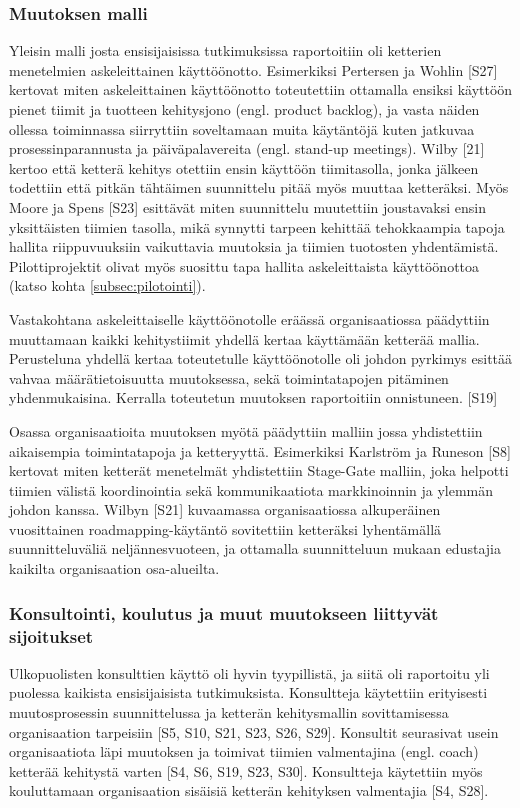 \subsubsection{Muutoksen malli}

Yleisin malli josta ensisijaisissa tutkimuksissa raportoitiin oli ketterien
menetelmien askeleittainen käyttöönotto. Esimerkiksi Pertersen ja Wohlin [S27]
kertovat miten askeleittainen käyttöönotto toteutettiin ottamalla ensiksi
käyttöön pienet tiimit ja tuotteen kehitysjono (engl. product backlog), ja vasta
näiden ollessa toiminnassa siirryttiin soveltamaan muita käytäntöjä kuten
jatkuvaa prosessinparannusta ja päiväpalavereita (engl. stand-up meetings).
Wilby [21] kertoo että ketterä kehitys otettiin ensin käyttöön tiimitasolla,
jonka jälkeen todettiin että pitkän tähtäimen suunnittelu pitää myös muuttaa
ketteräksi. Myös Moore ja Spens [S23] esittävät miten suunnittelu muutettiin
joustavaksi ensin yksittäisten tiimien tasolla, mikä synnytti tarpeen kehittää
tehokkaampia tapoja hallita riippuvuuksiin vaikuttavia muutoksia ja tiimien
tuotosten yhdentämistä. Pilottiprojektit olivat myös suosittu tapa hallita
askeleittaista käyttöönottoa (katso kohta \ref{subsec:pilotointi}).

Vastakohtana askeleittaiselle käyttöönotolle eräässä organisaatiossa päädyttiin
muuttamaan kaikki kehitystiimit yhdellä kertaa käyttämään ketterää mallia.
Perusteluna yhdellä kertaa toteutetulle käyttöönotolle oli johdon pyrkimys
esittää vahvaa määrätietoisuutta muutoksessa, sekä toimintatapojen pitäminen
yhdenmukaisina. Kerralla toteutetun muutoksen raportoitiin onnistuneen. [S19]

Osassa organisaatioita muutoksen myötä päädyttiin malliin jossa yhdistettiin
aikaisempia toimintatapoja ja ketteryyttä. Esimerkiksi Karlström ja Runeson [S8]
kertovat miten ketterät menetelmät yhdistettiin Stage-Gate malliin, joka
helpotti tiimien välistä koordinointia sekä kommunikaatiota markkinoinnin ja
ylemmän johdon kanssa. Wilbyn [S21] kuvaamassa organisaatiossa alkuperäinen
vuosittainen roadmapping-käytäntö sovitettiin ketteräksi lyhentämällä
suunnitteluväliä neljännesvuoteen, ja ottamalla suunnitteluun mukaan edustajia
kaikilta organisaation osa-alueilta.

\subsubsection{Konsultointi, koulutus ja muut muutokseen liittyvät sijoitukset}

Ulkopuolisten konsulttien käyttö oli hyvin tyypillistä, ja siitä oli raportoitu
yli puolessa kaikista ensisijaisista tutkimuksista. Konsultteja käytettiin
erityisesti muutosprosessin suunnittelussa ja ketterän kehitysmallin
sovittamisessa organisaation tarpeisiin [S5, S10, S21, S23, S26, S29]. Konsultit
seurasivat usein organisaatiota läpi muutoksen ja toimivat tiimien valmentajina
(engl. coach) ketterää kehitystä varten [S4, S6, S19, S23, S30]. Konsultteja
käytettiin myös kouluttamaan organisaation sisäisiä ketterän kehityksen
valmentajia [S4, S28].

